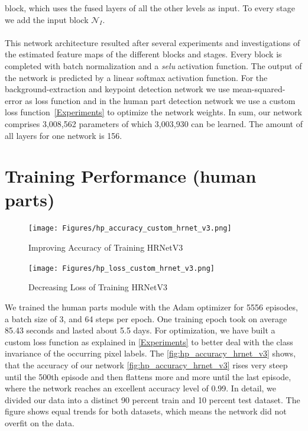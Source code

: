 block, which uses the fused layers of all the other levels as input.
To every stage we add the input block $\mathcal{N}_I$.
\\\mbox{}\\
This network architecture resulted after several experiments and investigations of the estimated feature maps of the
different blocks and stages.
Every block is completed with batch normalization and a \textit{selu} activation function.
The output of the network is predicted by a linear softmax activation function.
For the background-extraction and keypoint detection network we use mean-squared-error as loss function and in the
human part detection network we use a custom loss function~\autoref{Experiments} to optimize the network weights.
In sum, our network comprises 3,008,562 parameters of which 3,003,930 can be learned.
The amount of all layers for one network is 156.\\







\section{Training Performance (human parts)}
\begin{figure}
    \centering
    \texttt{[image: Figures/hp\_accuracy\_custom\_hrnet\_v3.png]}
    \decoRule
    \caption[HRNetv3 Training Process: Accuracy]{Improving Accuracy of Training HRNetV3}
    \label{fig:hp_accuracy_hrnet_v3}
\end{figure}
\begin{figure}
    \centering
    \texttt{[image: Figures/hp\_loss\_custom\_hrnet\_v3.png]}
    \decoRule
    \caption[HRNetv3 Training Process: Loss]{Decreasing Loss  of Training HRNetV3}
    \label{fig:hp_loss_hrnet_v3}
\end{figure}

We trained the human parts module with the Adam optimizer for 5556 episodes, a batch size of 3, and 64 steps per epoch.
One training epoch took on average 85.43 seconds and lasted about 5.5 days.
For optimization, we have built a custom loss function as explained in
\autoref{Experiments} to better deal with the class invariance of the occurring pixel labels.
The \autoref{fig:hp_accuracy_hrnet_v3} shows, that the accuracy of our network
\autoref{fig:hp_accuracy_hrnet_v3} rises very steep until the 500th episode and then flattens more and more until the last
episode, where the network reaches an excellent accuracy level of 0.99.
In detail, we divided our data into a distinct 90 percent train and 10 percent test dataset.
The figure shows equal trends for both datasets, which means the network did not overfit on the data.\


